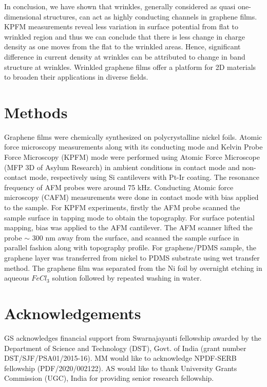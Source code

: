 \documentclass[preprint,aps,preprint,amsmath,amssymb]{revtex4-1}
\begin{document}
In conclusion, we have shown that wrinkles, generally considered as quasi one-dimensional structures, can act as highly conducting channels in graphene films. KPFM measurements reveal less variation in surface potential from flat to wrinkled region and thus we can conclude that there is less change in charge density as one moves from the flat to the wrinkled areas. Hence, significant difference in current density at wrinkles can be attributed to change in band structure at wrinkles. Wrinkled graphene films offer a platform for 2D materials to broaden their applications in diverse fields. 

\section*{Methods}
Graphene films were chemically synthesized on polycrystalline nickel foils. Atomic force microscopy measurements along with its conducting mode and  Kelvin Probe Force Microscopy (KPFM) mode were performed using Atomic Force Microscope (MFP 3D of Asylum Research) in ambient conditions in contact mode and non-contact mode, respectively using Si cantilevers with Pt-Ir coating. The resonance frequency of AFM probes were around 75 kHz. Conducting Atomic force microscopy (CAFM) measurements were done in contact mode with bias applied to the sample. For KPFM experiments, firstly the AFM probe scanned the sample surface in tapping mode to obtain the topography. For surface potential mapping, bias was applied to the AFM cantilever. The AFM scanner lifted the probe $\sim$ 300 nm away from the surface, and scanned the sample surface in parallel fashion along with topography profile. For graphene/PDMS sample, the graphene layer was transferred from nickel to PDMS substrate using wet transfer method. The graphene film was separated from the Ni foil by overnight etching in aqueous $FeCl_{3}$ solution followed by repeated washing in water. 

\section*{Acknowledgements}
GS acknowledges financial support from Swarnajayanti fellowship awarded by the Department of Science and Technology (DST), Govt. of India (grant number DST/SJF/PSA01/2015-16). MM would like to acknowledge NPDF-SERB fellowship (PDF/2020/002122). AS would like to thank University Grants Commission (UGC), India for providing senior research fellowship. 
\end{document}

